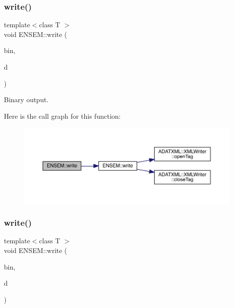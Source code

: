 \subsubsection{\texorpdfstring{write()}{write()}\hspace{0.1cm}{\footnotesize\ttfamily [9/13]}}
{\footnotesize\ttfamily template$<$class T $>$ \\
void E\+N\+S\+E\+M\+::write (\begin{DoxyParamCaption}\item[{\mbox{\hyperlink{classADATIO_1_1BinaryWriter}{A\+D\+A\+T\+I\+O\+::\+Binary\+Writer}} \&}]{bin,  }\item[{const \mbox{\hyperlink{classENSEM_1_1Ensem}{Ensem}}$<$ \mbox{\hyperlink{classENSEM_1_1OScalar}{O\+Scalar}}$<$ T $>$ $>$ \&}]{d }\end{DoxyParamCaption})\hspace{0.3cm}{\ttfamily [inline]}}



Binary output. 

Here is the call graph for this function\+:\nopagebreak
\begin{figure}[H]
\begin{center}
\leavevmode
\includegraphics[width=350pt]{d2/d94/namespaceENSEM_afee4cf5df7a009f056b6ea0bca81c639_cgraph}
\end{center}
\end{figure}
\mbox{\label{namespaceENSEM_a08ef39649c7f1ffb49d89bb6dc416676}} 
\subsubsection{\texorpdfstring{write()}{write()}\hspace{0.1cm}{\footnotesize\ttfamily [10/13]}}
{\footnotesize\ttfamily template$<$class T $>$ \\
void E\+N\+S\+E\+M\+::write (\begin{DoxyParamCaption}\item[{\mbox{\hyperlink{classADATIO_1_1BinaryWriter}{A\+D\+A\+T\+I\+O\+::\+Binary\+Writer}} \&}]{bin,  }\item[{const \mbox{\hyperlink{classENSEM_1_1Ensem}{Ensem}}$<$ \mbox{\hyperlink{classENSEM_1_1OVector}{O\+Vector}}$<$ T $>$ $>$ \&}]{d }\end{DoxyParamCaption})\hspace{0.3cm}{\ttfamily [inline]}}



